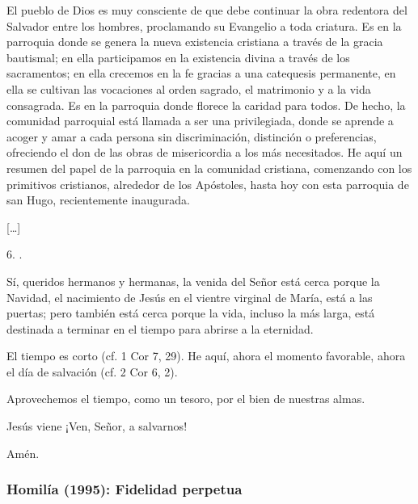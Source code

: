 \begin{body}
					El pueblo de Dios es muy consciente de que debe continuar la obra redentora del Salvador entre los hombres, proclamando su Evangelio a toda criatura. Es en la parroquia donde se genera la nueva existencia cristiana a través de la gracia bautismal; en ella participamos en la existencia divina a través de los sacramentos; en ella crecemos en la fe gracias a una catequesis permanente, en ella se cultivan las vocaciones al orden sagrado, el matrimonio y a la vida consagrada. Es en la parroquia donde florece la caridad para todos. De hecho, la comunidad parroquial está llamada a ser una  privilegiada, donde se aprende a acoger y amar a cada persona sin discriminación, distinción o preferencias, ofreciendo el don de las obras de misericordia a los más necesitados. He aquí un resumen del papel de la parroquia en la comunidad cristiana, comenzando con los primitivos cristianos, alrededor de los Apóstoles, hasta hoy con esta parroquia de san Hugo, recientemente inaugurada.
					
					{[}\ldots{}{]}
					
					6. .
					
					Sí, queridos hermanos y hermanas, la venida del Señor está cerca porque la Navidad, el nacimiento de Jesús en el vientre virginal de María, está a las puertas; pero también está cerca porque la vida, incluso la más larga, está destinada a terminar en el tiempo para abrirse a la eternidad.
					
					El tiempo es corto (cf. 1 Cor 7, 29). He aquí, ahora el momento favorable, ahora el día de salvación (cf. 2 Cor 6, 2).
					
					Aprovechemos el tiempo, como un tesoro, por el bien de nuestras almas.
					
					Jesús viene ¡Ven, Señor, a salvarnos!
					
					Amén.
				\end{body}					

			\subsubsection{Homilía (1995): Fidelidad perpetua}
			
				
